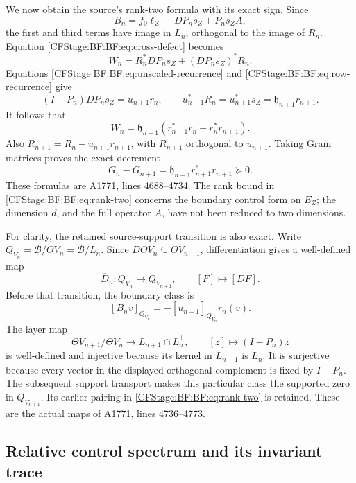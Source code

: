 We now obtain the source's rank-two formula with its exact sign.
Since
\[
B_n=f_0\ell_Z-DP_ns_Z+P_ns_ZA,
\]
the first and third terms have image in \(L_n\), orthogonal to
the image of \(R_n\).  Equation \eqref{CFStage:BF:BF:eq:cross-defect} becomes
\[
W_n=R_n^*DP_ns_Z+(DP_ns_Z)^*R_n.
\]
Equations \eqref{CFStage:BF:BF:eq:unscaled-recurrence} and
\eqref{CFStage:BF:BF:eq:row-recurrence} give
\[
(I-P_n)DP_ns_Z=u_{n+1}r_n,\qquad
u_{n+1}^*R_n=u_{n+1}^*s_Z
             =\mathfrak h_{n+1}r_{n+1}.
\]
It follows that
\begin{equation}
\boxed{\;
W_n=\mathfrak h_{n+1}
       \left(r_{n+1}^*r_n+r_n^*r_{n+1}\right).
\;}
\tag{BF.16}\label{CFStage:BF:BF:eq:rank-two}
\end{equation}
Also \(R_{n+1}=R_n-u_{n+1}r_{n+1}\), with \(R_{n+1}\)
orthogonal to \(u_{n+1}\).  Taking Gram matrices proves the exact
decrement
\begin{equation}
G_n-G_{n+1}
 =\mathfrak h_{n+1}r_{n+1}^*r_{n+1}\succeq0.
\tag{BF.17}\label{CFStage:BF:BF:eq:gram-decrement}
\end{equation}
These formulas are A1771, lines 4688--4734.  The rank bound in
\eqref{CFStage:BF:BF:eq:rank-two} concerns the boundary control form on \(E_Z\);
the dimension \(d\), and the full operator \(A\), have not been
reduced to two dimensions.

For clarity, the retained source-support transition is also exact.
Write \(Q_{V_n}=\mathcal B/\Theta V_n=\mathcal B/L_n\).
Since \(D\Theta V_n\subseteq\Theta V_{n+1}\), differentiation gives
a well-defined map
\[
\overline D_n:Q_{V_n}\longrightarrow Q_{V_{n+1}},
\qquad [F]\longmapsto[DF].
\]
Before that transition, the boundary class is
\[
[B_nv]_{Q_{V_n}}=-[u_{n+1}]_{Q_{V_n}}r_n(v).
\]
The layer map
\[
\Theta V_{n+1}/\Theta V_n
\longrightarrow L_{n+1}\cap L_n^\perp,\qquad
[z]\longmapsto(I-P_n)z
\]
is well-defined and injective because its kernel in \(L_{n+1}\)
is \(L_n\).  It is surjective because every vector in the displayed
orthogonal complement is fixed by \(I-P_n\).
The subsequent support transport makes this particular class the
supported zero in \(Q_{V_{n+1}}\).  Its earlier pairing in
\eqref{CFStage:BF:BF:eq:rank-two} is retained.  These are the actual maps of
A1771, lines 4736--4773.

\subsection{Relative control spectrum and its invariant trace}
\label{CFStage:BF:BF:trace}


